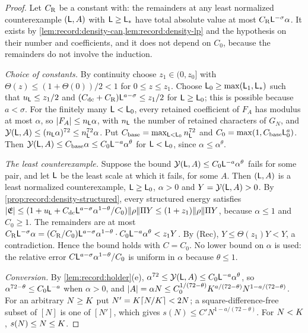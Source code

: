 \begin{proof}
Let $C_{\rm R}$ be a constant with: the remainders at any least normalized
counterexample $(\mathsf L,A)$ with $\mathsf L\ge\mathsf L_*$ have total absolute value at
most $C_{\rm R}\mathsf L^{-\sigma}\alpha$. It exists by
\cref{lem:record:density-can,lem:record:density-lp} and the hypothesis on
their number and coefficients, and it does not depend on $C_0$, because the
remainders do not involve the induction.

\emph{Choice of constants.} By continuity choose $z_1\in(0,z_0]$ with
$\Theta(z)\le(1+\Theta(0))/2<1$ for $0\le z\le z_1$. Choose
$\mathsf L_0\ge\max(\mathsf L_1,\mathsf L_*)$ such that $u_\mathsf L\le z_1/2$ and
$(C_{\rm dc}+C_{\rm R})\mathsf L^{a-\sigma}\le z_1/2$ for $\mathsf L\ge\mathsf L_0$; this is
possible because $a<\sigma$. For the finitely many $\mathsf L<\mathsf L_0$, every
retained coefficient of $F_A$ has modulus at most $\alpha$, so
$|F_A|\le n_\mathsf L\alpha$, with $n_\mathsf L$ the number of retained characters of
$G_N$, and $\mathcal Y(\mathsf L,A)\le(n_\mathsf L\alpha)^{72}\le n_\mathsf L^{72}\alpha$. Put
$C_{\rm base}=\max_{\mathsf L<\mathsf L_0}n_\mathsf L^{72}$ and
$C_0=\max(1,C_{\rm base}\mathsf L_0^a)$. Then
$\mathcal Y(\mathsf L,A)\le C_{\rm base}\alpha\le C_0\mathsf L^{-a}\alpha^\theta$ for
$\mathsf L<\mathsf L_0$, since $\alpha\le\alpha^\theta$.

\emph{The least counterexample.} Suppose the bound
$\mathcal Y(\mathsf L,A)\le C_0\mathsf L^{-a}\alpha^\theta$ fails for some pair, and let $\mathsf L$
be the least scale at which it fails, for some $A$. Then $(\mathsf L,A)$ is a least
normalized counterexample, $\mathsf L\ge\mathsf L_0$, $\alpha>0$ and $Y=\mathcal Y(\mathsf L,A)>0$.
By \cref{prop:record:density-structured}, every structured energy satisfies
$|\mathfrak E|\le(1+u_\mathsf L+C_{\rm dc}\mathsf L^{a-\sigma}\alpha^{1-\theta}/C_0)
\|\rho\|\Pi Y\le(1+z_1)\|\rho\|\Pi Y$, because $\alpha\le1$ and $C_0\ge1$. The
remainders are at most
$C_{\rm R}\mathsf L^{-\sigma}\alpha=(C_{\rm R}/C_0)\mathsf L^{a-\sigma}\alpha^{1-\theta}
\cdot C_0\mathsf L^{-a}\alpha^\theta<z_1Y$. By (Rec), $Y\le\Theta(z_1)Y<Y$, a
contradiction. Hence the bound holds with $C=C_0$. No lower bound on $\alpha$
is used: the relative error $C\mathsf L^{a-\sigma}\alpha^{1-\theta}/C_0$ is uniform
in $\alpha$ because $\theta\le1$.

\emph{Conversion.} By \cref{lem:record:holder}(e), $\alpha^{72}\le\mathcal Y(\mathsf L,A)
\le C_0\mathsf L^{-a}\alpha^\theta$, so $\alpha^{72-\theta}\le C_0\mathsf L^{-a}$ when
$\alpha>0$, and
$|A|=\alpha N\le C_0^{1/(72-\theta)}K^{a/(72-\theta)}N^{1-a/(72-\theta)}$.
For an arbitrary $N\ge K$ put $N'=K\lceil N/K\rceil<2N$; a
square-difference-free subset of $[N]$ is one of $[N']$, which gives
$s(N)\le C'N^{1-a/(72-\theta)}$. For $N<K$, $s(N)\le N\le K$.
\end{proof}

